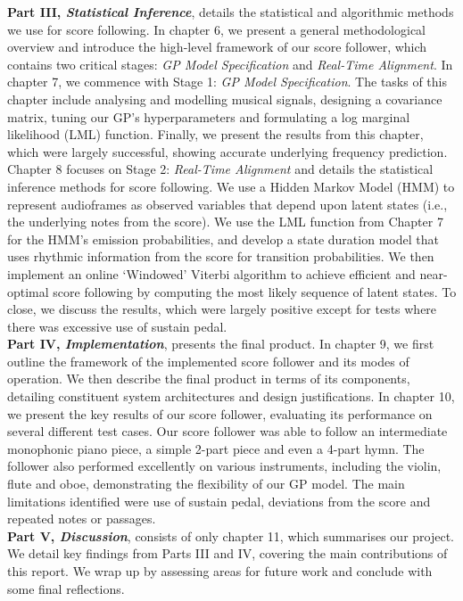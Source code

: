 \textbf{Part III, \textit{Statistical Inference}}, details the statistical and algorithmic methods we use for score following. In chapter 6, we present a general methodological overview and introduce the high-level framework of our score follower, which contains two critical stages: \textit{GP Model Specification} and \textit{Real-Time Alignment}.  In chapter 7, we commence with Stage 1: \textit{GP Model Specification}. The tasks of this chapter include analysing and modelling musical signals, designing a covariance matrix, tuning our GP's hyperparameters and formulating a log marginal likelihood (LML) function. Finally, we present the results from this chapter, which were largely successful, showing accurate underlying frequency prediction. Chapter 8 focuses on Stage 2: \textit{Real-Time Alignment} and details the statistical inference methods for score following. We use a Hidden Markov Model (HMM) to represent audioframes as observed variables that depend upon latent states (i.e., the underlying notes from the score). We use the LML function from Chapter 7 for the HMM's emission probabilities, and develop a state duration model that uses rhythmic information from the score for transition probabilities. We then implement an online `Windowed' Viterbi algorithm to achieve efficient and near-optimal score following by computing the most likely sequence of latent states. To close, we discuss the results, which were largely positive except for tests where there was excessive use of sustain pedal. \\

\textbf{Part IV, \textit{Implementation}}, presents the final product. In chapter 9, we first outline the framework of the implemented score follower and its modes of operation. We then describe the final product in terms of its components, detailing constituent system architectures and design justifications. In chapter 10, we present the key results of our  score follower, evaluating its performance on several different test cases. Our score follower was able to follow an intermediate monophonic piano piece, a simple 2-part piece and even a 4-part hymn. The follower also performed excellently on various instruments, including the violin, flute and oboe, demonstrating the flexibility of our GP model. The main limitations identified were use of sustain pedal, deviations from the score and repeated notes or passages. \\

\textbf{Part V, \textit{Discussion}}, consists of only chapter 11, which summarises our project. We detail key findings from Parts III and IV, covering the main contributions of this report. We wrap up by assessing areas for future work and conclude with some final reflections.
